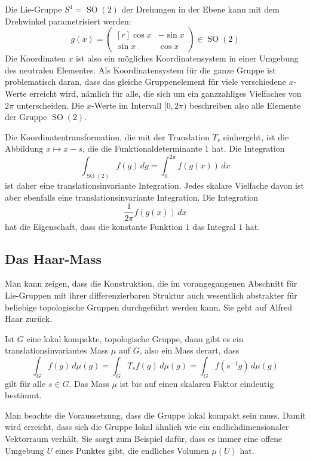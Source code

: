 \begin{beispiel}
Die Lie-Gruppe $S^1 = \operatorname{SO}(2)$ der Drehungen in der Ebene
kann mit dem Drehwinkel parametrisiert werden:
\[
g(x)
=
\begin{pmatrix*}[r]
\cos x&-\sin x\\
\sin x& \cos x
\end{pmatrix*}
\in
\operatorname{SO}(2)
\]
Die Koordinaten $x$ ist also ein mögliches Koordinatensystem in einer
Umgebung des neutralen Elementes.
Als Koordinatensystem für die ganze Gruppe ist problematisch daran,
dass das gleiche Gruppenelement für viele verschiedene $x$-Werte
erreicht wird, nämlich für alle, die sich um ein ganzzahliges
Vielfaches von $2\pi$ unterscheiden.
Die $x$-Werte im Intervall $[0,2\pi)$ beschreiben also alle Elemente
der Gruppe $\operatorname{SO}(2)$. 

Die Koordinatentransformation, die mit der Translation $T_s$ einhergeht,
ist die Abbildung $x\mapsto x-s$, die die Funktionaldeterminante $1$
hat.
Die Integration
\[
\int_{\operatorname{SO}(2)} f(g) \,dg
=
\int_0^{2\pi} f(g(x))\,dx
\]
ist daher eine translationsinvariante Integration.
Jedes skalare Vielfache davon ist aber ebenfalls eine translationsinvariante
Integration.
Die Integration
\[
\frac{1}{2\pi} f(g(x))\,dx
\]
hat die Eigenschaft, dass die konstante Funktion $1$ das Integral $1$
hat.
\end{beispiel}

%
%
\subsection{Das Haar-Mass
\label{buch:haar:subsection:haar}}
Man kann zeigen, dass die Konstruktion, die im vorangegangenen Abschnitt
für Lie-Gruppen mit ihrer differenzierbaren Struktur auch wesentlich
abstrakter für beliebige topologische Gruppen durchgeführt werden kann.
Sie geht auf Alfred Haar zurück.

\begin{satz}[Haar]
\label{buch:gruppen:haar:satz:haar}
Ist $G$ eine lokal kompakte, topologische Gruppe, dann gibt es ein
translationsinvariantes Mass $\mu$ auf $G$, also ein Mass derart,
dass 
\[
\int_G f(g)\,d\mu(g)
=
\int_G T_sf(g)\,d\mu(g)
=
\int_G f(s^{-1}g)\,d\mu(g)
\]
gilt für alle $s\in G$.
Das Mass $\mu$ ist bis auf einen skalaren Faktor eindeutig bestimmt.
\end{satz}

Man beachte die Voraussetzung, dass die Gruppe lokal kompakt sein
muss.
Damit wird erreicht, dass sich die Gruppe lokal ähnlich wie ein
endlichdimensionaler Vektorraum verhält.
Sie sorgt zum Beispiel dafür, dass es immer eine offene Umgebung
$U$ eines Punktes gibt, die endliches Volumen $\mu(U)$ hat.

